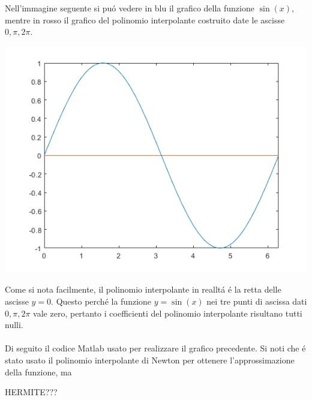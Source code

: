 \begin{center}
\footnotesize\noindent{}\end{center}

\noindent Nell'immagine seguente si pu\'o vedere in blu il grafico della funzione \(\sin(x)\), mentre in rosso il grafico del polinomio interpolante costruito date le ascisse \(0, \pi, 2\pi \).
\begin{center}
	\includegraphics[scale=0.7]{cap4/4-4.png}
\end{center}
\noindent Come si nota facilmente, il polinomio interpolante in reallt\'a \'e la retta delle ascisse \(y=0\). Questo perch\'e la funzione \(y = \sin(x)\) nei tre punti di ascissa dati \(0, \pi, 2\pi \) vale zero, pertanto i coefficienti del polinomio interpolante risultano tutti nulli. \\ \\
\noindent Di seguito il codice Matlab usato per realizzare il grafico precedente. Si noti che \'e stato usato il polinomio interpolante di Newton per ottenere l'approssimazione della funzione, ma

HERMITE???
